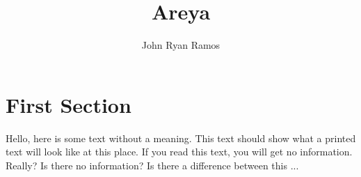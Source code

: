 \documentclass{article}
\title{Areya}
\author{John Ryan Ramos}
\begin{document}
	
	\maketitle
	\newpage
	
	
	\section{First Section}
	
	Hello,  here  is  some  text  without  a  meaning.   This  
	text  should  show  what  a printed text will look like at 
	this place.  If you read this text, you will get no information.  
	Really?  Is there no information?  Is there a difference between 
	this ...
	
\end{document}
